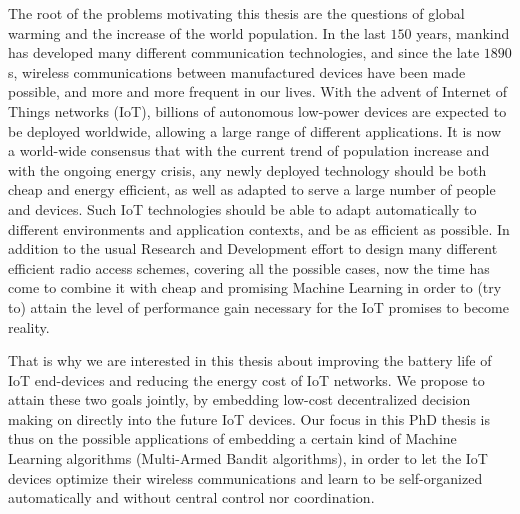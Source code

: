 %
The root of the problems motivating this thesis are the questions of global warming and the increase of the world population.
In the last $150$ years, mankind has developed many different communication technologies, and since the late $1890$s, wireless communications between manufactured devices have been made possible, and more and more frequent in our lives.
With the advent of Internet of Things networks (IoT), billions of autonomous low-power devices are expected to be deployed worldwide, allowing a large range of different applications.
It is now a world-wide consensus that with the current trend of population increase and with the ongoing energy crisis, any newly deployed technology should be both cheap and energy efficient,
as well as adapted to serve a large number of people and devices.
%
Such IoT technologies should be able to adapt automatically to different environments and application contexts, and be as efficient as possible.
%
In addition to the usual Research and Development effort to design many different efficient radio access schemes, covering all the possible cases,
now the time has come to combine it with cheap and promising Machine Learning in order to (try to) attain the level of performance gain necessary for the IoT promises to become reality.

That is why we are interested in this thesis about
improving the battery life of IoT end-devices and reducing the energy cost of IoT networks.
We propose to attain these two goals jointly, by embedding low-cost decentralized decision making on directly into the future IoT devices.
%
Our focus in this PhD thesis is thus on the possible applications of embedding a certain kind of Machine Learning algorithms (Multi-Armed Bandit algorithms), in order to let the IoT devices optimize their wireless communications and learn to be self-organized automatically and without central control nor coordination.


